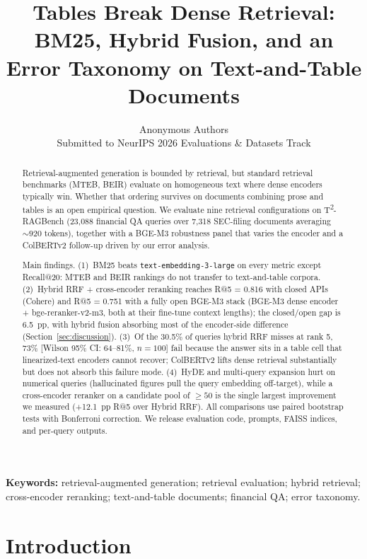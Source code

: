 \documentclass{article}
\title{Tables Break Dense Retrieval: BM25, Hybrid Fusion, and an Error Taxonomy on Text-and-Table Documents}
\author{%
  Anonymous Authors \\
  Submitted to NeurIPS 2026 Evaluations \& Datasets Track
}
\begin{document}
\maketitle

\begin{abstract}
Retrieval-augmented generation is bounded by retrieval, but standard retrieval benchmarks (MTEB, BEIR) evaluate on homogeneous text where dense encoders typically win. Whether that ordering survives on documents combining prose and tables is an open empirical question. We evaluate nine retrieval configurations on T\textsuperscript{2}-RAGBench (23{,}088 financial QA queries over 7{,}318 SEC-filing documents averaging ${\sim}920$ tokens), together with a BGE-M3 robustness panel that varies the encoder and a ColBERTv2 follow-up driven by our error analysis.

Main findings. (1)~BM25 beats \texttt{text-embedding-3-large} on every metric except Recall@20: MTEB and BEIR rankings do not transfer to text-and-table corpora. (2)~Hybrid RRF + cross-encoder reranking reaches R@5 = 0.816 with closed APIs (Cohere) and R@5 = 0.751 with a fully open BGE-M3 stack (BGE-M3 dense encoder + bge-reranker-v2-m3, both at their fine-tune context lengths); the closed/open gap is 6.5~pp, with hybrid fusion absorbing most of the encoder-side difference (Section~\ref{sec:discussion}). (3)~Of the 30.5\% of queries hybrid RRF misses at rank 5, 73\% [Wilson 95\% CI: 64--81\%, $n=100$] fail because the answer sits in a table cell that linearized-text encoders cannot recover; ColBERTv2 lifts dense retrieval substantially but does not absorb this failure mode. (4)~HyDE and multi-query expansion hurt on numerical queries (hallucinated figures pull the query embedding off-target), while a cross-encoder reranker on a candidate pool of $\geq 50$ is the single largest improvement we measured (+12.1~pp R@5 over Hybrid RRF). All comparisons use paired bootstrap tests with Bonferroni correction. We release evaluation code, prompts, FAISS indices, and per-query outputs.
\end{abstract}

\noindent\textbf{Keywords:} retrieval-augmented generation; retrieval evaluation; hybrid retrieval; cross-encoder reranking; text-and-table documents; financial QA; error taxonomy.

\section{Introduction}
\label{sec:intro}
\end{document}
